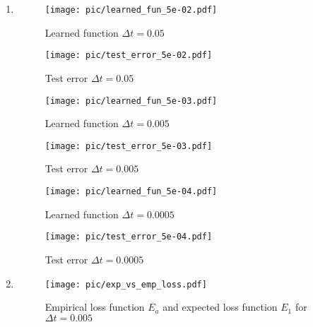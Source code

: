 \documentclass[a4paper,11pt]{scrartcl}
\newcommand*{\Dt}{\Delta{}t}
\begin{document}
\begin{enumerate}
\begin{enumerate}[leftmargin=1em]
  \item
    \begin{figure}[h]
        \begin{minipage}[b]{.5\linewidth}
          \centering
          \texttt{[image: pic/learned\_fun\_5e-02.pdf]}
          \caption{Learned function $\Dt=0.05$}
          \label{fig:learned_fun_0.05}
        \end{minipage}%
        \begin{minipage}[b]{.5\linewidth}
          \centering
          \texttt{[image: pic/test\_error\_5e-02.pdf]}
          \caption{Test error $\Dt=0.05$}
          \label{fig:test_error_0.05}
        \end{minipage}
    \end{figure}
    \begin{figure}[h]
        \begin{minipage}[b]{.5\linewidth}
          \centering
          \texttt{[image: pic/learned\_fun\_5e-03.pdf]}
          \caption{Learned function $\Dt=0.005$}
          \label{fig:learned_fun_0.005}
        \end{minipage}%
        \begin{minipage}[b]{.5\linewidth}
          \centering
          \texttt{[image: pic/test\_error\_5e-03.pdf]}
          \caption{Test error $\Dt=0.005$}
          \label{fig:test_error_0.005}
        \end{minipage}
    \end{figure}
    \begin{figure}[h]
        \begin{minipage}[b]{.5\linewidth}
          \centering
          \texttt{[image: pic/learned\_fun\_5e-04.pdf]}
          \caption{Learned function $\Dt=0.0005$}
          \label{fig:learned_fun_0.0005}
        \end{minipage}%
        \begin{minipage}[b]{.5\linewidth}
          \centering
          \texttt{[image: pic/test\_error\_5e-04.pdf]}
          \caption{Test error $\Dt=0.0005$}
          \label{fig:test_error_0.0005}
        \end{minipage}
    \end{figure}

  \item
    \begin{figure}[h]
      \centering
      \texttt{[image: pic/exp\_vs\_emp\_loss.pdf]}
      \caption{Empirical loss function $E_a$ and expected loss function $E_1$
        for $\Dt = 0.005$}
      \label{fig:empirical_loss}
    \end{figure}


\end{enumerate}
\end{enumerate}
\end{document}
